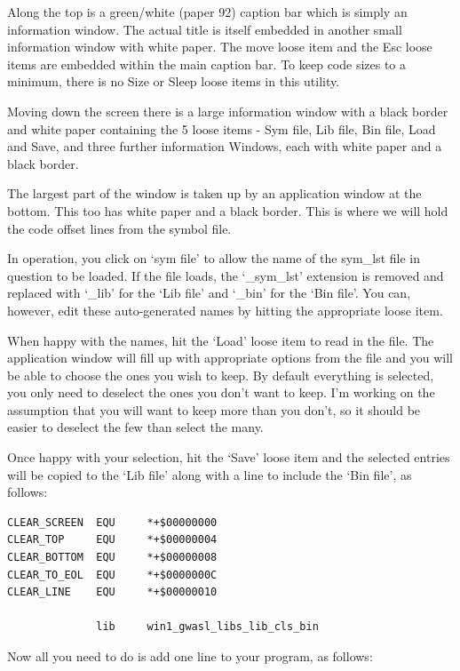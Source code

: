 Along the top is a green/white (paper 92) caption bar which is
    simply an information window. The actual title is itself embedded in
    another small information window with white paper. The move loose item and
    the Esc loose items are embedded within the main caption bar. To keep code
    sizes to a minimum, there is no Size or Sleep loose items in this
    utility.

Moving down the screen there is a large information window with a
    black border and white paper containing the 5 loose items -{} Sym file, Lib
    file, Bin file, Load and Save, and three further information Windows, each
    with white paper and a black border.

The largest part of the window is taken up by an application window
    at the bottom. This too has white paper and a black border. This is where
    we will hold the code offset lines from the symbol file.

In operation, you click on `sym file' to allow the name of the
    sym\_lst file in question to be loaded. If the file loads, the `\_sym\_lst'
    extension is removed and replaced with `\_lib' for the `Lib file' and
    `\_bin' for the `Bin file'. You can, however, edit these auto-{}generated
    names by hitting the appropriate loose item.

When happy with the names, hit the `Load' loose item to read in the
    file. The application window will fill up with appropriate options from
    the file and you will be able to choose the ones you wish to keep. By
    default everything is selected, you only need to deselect the ones you
    don't want to keep. I'm working on the assumption that you will want to
    keep more than you don't, so it should be easier to deselect the few than
    select the many.

Once happy with your selection, hit the `Save' loose item and the
    selected entries will be copied to the `Lib file' along with a line to
    include the `Bin file', as follows:

\begin{lstlisting}[firstnumber=1,]
CLEAR_SCREEN  EQU     *+$00000000
CLEAR_TOP     EQU     *+$00000004
CLEAR_BOTTOM  EQU     *+$00000008
CLEAR_TO_EOL  EQU     *+$0000000C
CLEAR_LINE    EQU     *+$00000010

              lib     win1_gwasl_libs_lib_cls_bin
\end{lstlisting}

Now all you need to do is add one line to your program, as
    follows:

